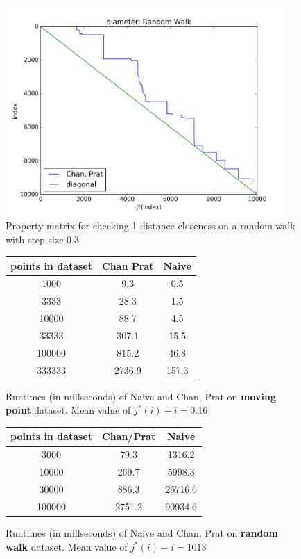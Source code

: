 \documentclass{article}
\begin{document}
\begin{figure}[!ht]
  \centering
  \includegraphics[height=8cm]{../plots/diameter_random_walk}
  \caption{Property matrix for checking 1 distance closeness on a random walk with step size 0.3}
  \label{fig:diameter_demo}
\end{figure}

\begin{figure}[!ht]
  \centering
\begin{tabular}{c|c|c}
    points in dataset &  Chan Prat    & Naive  \\
\hline
    1000    & 9.3    & 0.5  \\
\hline
    3333    & 28.3    & 1.5  \\
\hline
    10000    & 88.7    & 4.5  \\
\hline
    33333    & 307.1    & 15.5  \\
\hline
    100000    & 815.2    & 46.8  \\
\hline
    333333    & 2736.9    & 157.3 
\end{tabular}
  \caption{Runtimes (in millseconds) of Naive and Chan, Prat on \textbf{moving point} dataset. Mean value of $j^*(i) - i = 0.16$}
  \label{fig:diameter_comparison_moving_gaussian}
\end{figure}

\begin{figure}[!ht]
  \centering
\begin{tabular}{c|c|c}
    points in dataset &  Chan/Prat    & Naive  \\
\hline
    3000    & 79.3    & 1316.2  \\
\hline
    10000    & 269.7    & 5998.3  \\
\hline
    30000    & 886.3    & 26716.6  \\
\hline
    100000    & 2751.2    & 90934.6 
\end{tabular}
  \caption{Runtimes (in millseconds) of Naive and Chan, Prat on \textbf{random walk} dataset. Mean value of $j^*(i) - i = 1013$}
  \label{fig:diameter_comparison_random_walk}
\end{figure}
\end{document}
